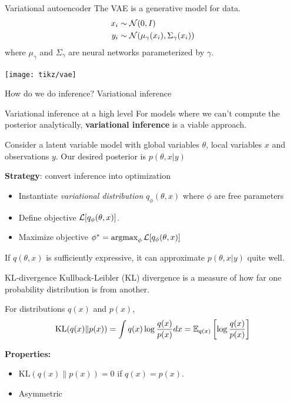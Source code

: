 \documentclass[10pt, compress]{beamer}
\begin{document}
\begin{frame}{Variational autoencoder}
  The VAE is a generative model for data.
  \begin{align*}
    x_i &\sim  \mathcal{N}(0, I) \\
    y_i &\sim  \mathcal{N}(\mu_\gamma(x_i), \Sigma_\gamma(x_i))
  \end{align*}
  where $\mu_\gamma$ and $\Sigma_\gamma$ are neural networks parameterized by $\gamma$.

  \pause
  \centering
  \texttt{[image: tikz/vae]}
  \pause
   
  How do we do inference?
  \alert<+>{Variational inference}
\end{frame}

\begin{frame}{Variational inference at a high level}
  For models where we can't compute
  the posterior analytically, \textbf{variational inference}
  is a viable approach.

  \pause
    Consider a latent variable model with global variables
    $\theta$, local variables $x$ and observations $y$. Our desired
    posterior is $p(\theta, x | y)$

    \pause
    \textbf{Strategy}: convert inference into optimization
    \begin{itemize}
        \pause
      \item Instantiate \emph{variational distribution} $q_\phi(\theta, x)$
        where $\phi$ are free parameters
        \pause
      \item Define objective $\mathcal{L}[q_\phi(\theta, x)]$.
        \pause
      \item Maximize objective $\phi^* = \operatorname*{argmax}_\phi \mathcal{L}[q_\phi(\theta, x)]$
    \end{itemize}
    \pause
    If $q(\theta, x)$ is sufficiently expressive,
    it can approximate $p(\theta, x | y)$ quite well.
\end{frame}

\iffalse
\begin{frame}{KL-divergence}
  Kullback-Leibler (KL) divergence
  is a measure of how far one probability distribution
  is from another.

  \pause
  For distributions $q(x)$ and $p(x)$,
  \begin{align*}
    \textrm{KL}(q(x)\|p(x)) = \int q(x)\log \frac{q(x)}{p(x)}dx = \mathbb{E}_{q(x)}\left[\log\frac{q(x)}{p(x)}\right]
  \end{align*}

  \pause
  \textbf{Properties:}
  \begin{itemize}
    \item $\textrm{KL}(q(x)\|p(x)) = 0$ if $q(x) = p(x)$.
    \item Asymmetric
  \end{itemize}
\end{frame}
\end{document}
